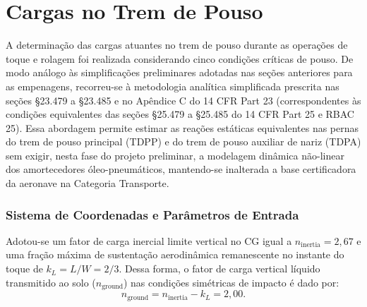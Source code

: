 \section{Cargas no Trem de Pouso}
\label{sec:cargas_solo}


A determinação das cargas atuantes no trem de pouso durante as operações de toque e rolagem foi realizada considerando cinco condições críticas de pouso. De modo análogo às simplificações preliminares adotadas nas seções anteriores para as empenagens, recorreu-se à metodologia analítica simplificada prescrita nas seções \S 23.479 a \S 23.485 e no Apêndice C do 14 CFR Part 23 (correspondentes às condições equivalentes das seções \S 25.479 a \S 25.485 do 14 CFR Part 25 e RBAC 25). Essa abordagem permite estimar as reações estáticas equivalentes nas pernas do trem de pouso principal (TDPP) e do trem de pouso auxiliar de nariz (TDPA) sem exigir, nesta fase do projeto preliminar, a modelagem dinâmica não-linear dos amortecedores óleo-pneumáticos, mantendo-se inalterada a base certificadora da aeronave na Categoria Transporte.

\subsubsection*{Sistema de Coordenadas e Parâmetros de Entrada}



Adotou-se um fator de carga inercial limite vertical no CG igual a $n_{\text{inertia}} = 2,67$ e uma fração máxima de sustentação aerodinâmica remanescente no instante do toque de $k_L = L/W = 2/3$. Dessa forma, o fator de carga vertical líquido transmitido ao solo ($n_{\text{ground}}$) nas condições simétricas de impacto é dado por:
\begin{equation}
    n_{\text{ground}} = n_{\text{inertia}} - k_L = 2,00.
    \label{eq:n_ground}
\end{equation}

